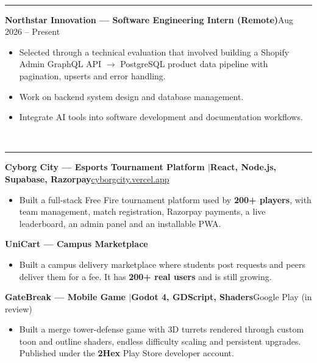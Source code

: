 \documentclass[10pt,a4paper]{article}
\renewcommand{\section}[1]{\vspace{6pt}{\large\bfseries\MakeUppercase{#1}}\\[-7pt]\rule{\textwidth}{0.6pt}\vspace{2pt}}
\newcommand{\entry}[2]{\par\textbf{#1}\hfill #2\par}
\newenvironment{points}{\vspace{-4pt}\begin{itemize}\setlength{\itemsep}{0pt}\setlength{\parskip}{0pt}\setlength{\topsep}{0pt}\setlength{\partopsep}{0pt}\setlength{\leftmargin}{12pt}}{\end{itemize}\vspace{-2pt}}
\newcommand{\sep}{\enspace$|$\enspace}
\begin{document}
\section{Experience}
\entry{Northstar Innovation --- Software Engineering Intern (Remote)}{Aug 2026 -- Present}
\begin{points}
  \item Selected through a technical evaluation that involved building a Shopify Admin GraphQL API $\rightarrow$ PostgreSQL product data pipeline with pagination, upserts and error handling.
  \item Work on backend system design and database management.
  \item Integrate AI tools into software development and documentation workflows.
\end{points}

\section{Live Products}
\entry{Cyborg City --- Esports Tournament Platform \textnormal{\sep React, Node.js, Supabase, Razorpay}}{\href{https://cyborgcity.vercel.app}{cyborgcity.vercel.app}}
\begin{points}
  \item Built a full-stack Free Fire tournament platform used by \textbf{200+ players}, with team management, match registration, Razorpay payments, a live leaderboard, an admin panel and an installable PWA.
\end{points}
\entry{UniCart --- Campus Marketplace}{}
\begin{points}
  \item Built a campus delivery marketplace where students post requests and peers deliver them for a fee. It has \textbf{200+ real users} and is still growing.
\end{points}
\entry{GateBreak --- Mobile Game \textnormal{\sep Godot 4, GDScript, Shaders}}{Google Play (in review)}
\begin{points}
  \item Built a merge tower-defense game with 3D turrets rendered through custom toon and outline shaders, endless difficulty scaling and persistent upgrades. Published under the \textbf{2Hex} Play Store developer account.
\end{points}
\end{document}
